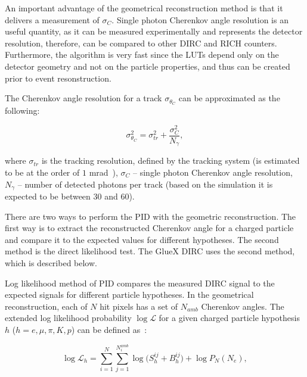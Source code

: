 An important advantage of the geometrical reconstruction method is that it delivers a measurement of $\sigma_{C}$. Single photon Cherenkov angle resolution is an useful quantity, as it can be measured experimentally and represents the detector resolution, therefore, can be compared to other DIRC and RICH counters. Furthermore, the algorithm is very fast since the LUTs depend only on the detector geometry and not on the particle properties, and thus can be created prior to event resonstruction.

The Cherenkov angle resolution for a track $\sigma_{\theta_{C}}$ can be approximated as the following:

\begin{equation}
\sigma^{2}_{\theta_{C}} = \sigma^{2}_{tr} + \frac{\sigma^{2}_{C}}{N_{\gamma}},
\end{equation}

\noindent where $\sigma_{tr}$ is the tracking resolution, defined by the tracking system (is estimated to be at the order of $1$ mrad~\cite{tdr}), $\sigma_{C}$ -- single photon Cherenkov angle resolution, $N_{\gamma}$ -- number of detected photons per track (based on the simulation it is expected to be between 30 and 60).

There are two ways to perform the PID with the geometric reconstruction. The first way is to extract the reconstructed Cherenkov angle for a charged particle and compare it to the expected values for different hypotheses. The second method is the direct likelihood test. The GlueX DIRC uses the second method, which is described below.

Log likelihood method of PID compares the measured DIRC signal to the expected signals for different particle hypotheses. In the geometrical reconstruction, each of $N$ hit pixels has a set of $N_{amb}$ Cherenkov angles. The extended log likelihood probability $\log\mathcal{L}$ for a given charged particle hypothesis $h$ ($h = e, \mu, \pi, K, p$) can be defined as~\cite{staric2}:

\begin{equation}
\log\mathcal{L}_{h} = \sum_{i=1}^{N} \sum_{j=1}^{N^{amb}_{i}} \log \Big( S_{h}^{ij} + B_{h}^{ij} \Big) + \log P_{N}(N_{e}),
\label{eq:ll}
\end{equation}

